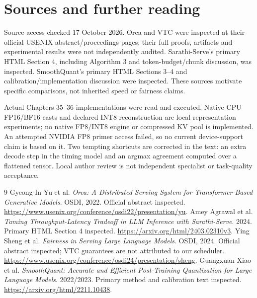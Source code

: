 \chapter*{Sources and further reading}
Source access checked 17 October 2026. Orca and VTC were inspected at their
official USENIX abstract/proceedings pages; their full proofs, artifacts
and experimental results were not independently audited. Sarathi-Serve's
primary HTML Section 4, including Algorithm 3 and token-budget/chunk
discussion, was inspected. SmoothQuant's primary HTML Sections 3--4 and
calibration/implementation discussion were inspected. These sources motivate
specific comparisons, not inherited speed or fairness claims.

Actual Chapters 35--36 implementations were read and executed. Native CPU
FP16/BF16 casts and declared INT8 reconstruction are local representation
experiments; no native FP8/INT8 engine or compressed KV pool is implemented.
An attempted NVIDIA FP8 primer access failed, so no current device-support
claim is based on it. Two tempting shortcuts are corrected in the text: an extra decode step in the timing model and an argmax agreement computed over a flattened tensor.
Local author review is not independent specialist or task-quality acceptance.
\begin{thebibliography}{9}
 Gyeong-In Yu et al.
\emph{Orca: A Distributed Serving System for Transformer-Based Generative
Models}. OSDI, 2022. Official abstract inspected.
\url{https://www.usenix.org/conference/osdi22/presentation/yu}.
 Amey Agrawal et al.
\emph{Taming Throughput-Latency Tradeoff in LLM Inference with Sarathi-Serve}.
2024. Primary HTML Section 4 inspected.
\url{https://arxiv.org/html/2403.02310v3}.
 Ying Sheng et al.
\emph{Fairness in Serving Large Language Models}. OSDI, 2024.
Official abstract inspected; VTC guarantees are not attributed to our scheduler.
\url{https://www.usenix.org/conference/osdi24/presentation/sheng}.
 Guangxuan Xiao et al.
\emph{SmoothQuant: Accurate and Efficient Post-Training Quantization for
Large Language Models}. 2022/2023. Primary method and calibration text inspected.
\url{https://arxiv.org/html/2211.10438}.
\end{thebibliography}
